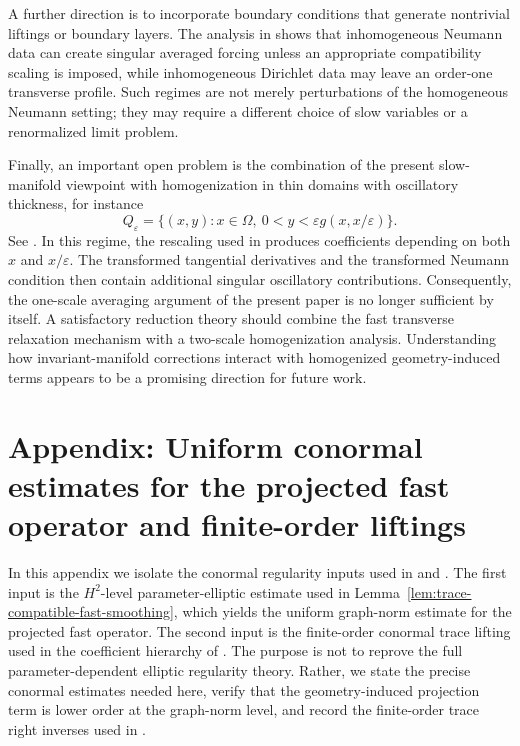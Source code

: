\documentclass[11pt]{article}
\theoremstyle{definition}
\theoremstyle{remark}
\numberwithin{equation}{section}
\begin{document}
A further direction is to incorporate boundary conditions that generate
nontrivial liftings or boundary layers. The analysis in 
shows that inhomogeneous Neumann data can create singular averaged forcing
unless an appropriate compatibility scaling is imposed, while inhomogeneous
Dirichlet data may leave an order-one transverse profile. Such regimes are
not merely perturbations of the homogeneous Neumann setting; they may require
a different choice of slow variables or a renormalized limit problem.

Finally, an important open problem is the combination of the present
slow-manifold viewpoint with homogenization in thin domains with oscillatory
thickness, for instance
\[
Q_\varepsilon
=
\{(x,y):x\in\Omega,\ 0<y<\varepsilon g(x,x/\varepsilon)\}.
\]
See \cite{arrieta2011semilinear,arrieta2011homogenization}. In this regime,
the rescaling used in  produces coefficients depending
on both \(x\) and \(x/\varepsilon\). The transformed tangential derivatives
and the transformed Neumann condition then contain additional singular
oscillatory contributions. Consequently, the one-scale averaging argument of
the present paper is no longer sufficient by itself. A satisfactory reduction
theory should combine the fast transverse relaxation mechanism with a
two-scale homogenization analysis. Understanding how invariant-manifold
corrections interact with homogenized geometry-induced terms appears to be a
promising direction for future work.



\appendix

\section{Appendix: Uniform conormal estimates for the projected fast operator and finite-order liftings}
\label{app:uniform-parameter-elliptic-estimate}

In this appendix we isolate the conormal regularity inputs used in
 and
. The first input is the
\(H^2\)-level parameter-elliptic estimate used in
Lemma~\ref{lem:trace-compatible-fast-smoothing}, which yields the uniform
graph-norm estimate for the projected fast operator. The second input is the
finite-order conormal trace lifting used in the coefficient hierarchy of
. The purpose is not to reprove the
full parameter-dependent elliptic regularity theory. Rather, we state the
precise conormal estimates needed here, verify that the geometry-induced
projection term is lower order at the graph-norm level, and record the
finite-order trace right inverses used in
.
\end{document}
